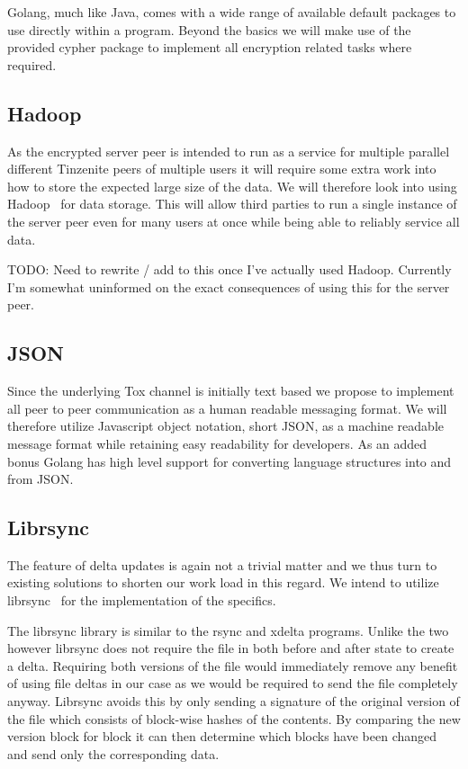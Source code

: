 Golang, much like Java, comes with a wide range of available default packages to use directly within a program.
Beyond the basics we will make use of the provided cypher package to implement all encryption related tasks where required.

\subsection{Hadoop}

As the encrypted server peer is intended to run as a service for multiple parallel different Tinzenite peers of multiple users it will require some extra work into how to store the expected large size of the data.
We will therefore look into using Hadoop~\cite{web:site:hadoop} for data storage.
This will allow third parties to run a single instance of the server peer even for many users at once while being able to reliably service all data.

TODO: Need to rewrite / add to this once I've actually used Hadoop.
Currently I'm somewhat uninformed on the exact consequences of using this for the server peer.

\subsection{JSON}
\label{sub:JSON}

Since the underlying Tox channel is initially text based we propose to implement all peer to peer communication as a human readable messaging format.
We will therefore utilize Javascript object notation, short JSON, as a machine readable message format while retaining easy readability for developers.
As an added bonus Golang has high level support for converting language structures into and from JSON.

\subsection{Librsync}

The feature of delta updates is again not a trivial matter and we thus turn to existing solutions to shorten our work load in this regard.
We intend to utilize librsync~\cite{web:site:librsync} for the implementation of the specifics.

The librsync library is similar to the rsync and xdelta programs.
Unlike the two however librsync does not require the file in both before and after state to create a delta.
Requiring both versions of the file would immediately remove any benefit of using file deltas in our case as we would be required to send the file completely anyway.
Librsync avoids this by only sending a signature of the original version of the file which consists of block-wise hashes of the contents.
By comparing the new version block for block it can then determine which blocks have been changed and send only the corresponding data.

